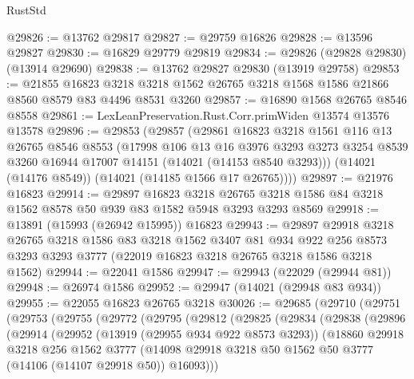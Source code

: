 \begin{lexlean}{RustStd}
\begin{coremodule}
@29826 := @13762 @29817
@29827 := @29759 @16826
@29828 := @13596 @29827
@29830 := @16829 @29779 @29819
@29834 := @29826 (@29828 @29830) (@13914 @29690)
@29838 := @13762 @29827 @29830 (@13919 @29758)
@29853 := @21855
    @16823
    @3218
    @3218
    @1562
    @26765
    @3218
    @1568
    @1586
    @21866
    @8560
    @8579
    @83
    @4496
    @8531
    @3260
@29857 := @16890 @1568 @26765 @8546 @8558
@29861 := LexLeanPreservation.Rust.Corr.primWiden @13574 @13576 @13578
@29896 := @29853
    (@29857
      (@29861
        @16823
        @3218
        @1561
        @116
        @13
        @26765
        @8546
        @8553
        (@17998
          @106
          @13
          @16
          @3976
          @3293
          @3273
          @3254
          @8539
          @3260
          @16944
          @17007
          @14151
          (@14021 (@14153 @8540 @3293)))
        (@14021 (@14176 @8549))
        (@14021 (@14185 @1566 @17 @26765))))
@29897 := @21976 @16823
@29914 := @29897
    @16823
    @3218
    @26765
    @3218
    @1586
    @84
    @3218
    @1562
    @8578
    @50
    @939
    @83
    @1582
    @5948
    @3293
    @3293
    @8569
@29918 := @13891 (@15993 (@26942 @15995)) @16823
@29943 := @29897
    @29918
    @3218
    @26765
    @3218
    @1586
    @83
    @3218
    @1562
    @3407
    @81
    @934
    @922
    @256
    @8573
    @3293
    @3293
    @3777
    (@22019 @16823 @3218 @26765 @3218 @1586 @3218 @1562)
@29944 := @22041 @1586
@29947 := @29943 (@22029 (@29944 @81))
@29948 := @26974 @1586
@29952 := @29947 (@14021 (@29948 @83 @934))
@29955 := @22055 @16823 @26765 @3218
@30026 := @29685
    (@29710
      (@29751
        (@29753
          (@29755
            (@29772
              (@29795
                (@29812
                  (@29825
                    (@29834
                      (@29838
                        (@29896
                          (@29914
                            (@29952
                              (@13919 (@29955 @934 @922 @8573 @3293))
                              (@18860
                                @29918
                                @3218
                                @256
                                @1562
                                @3777
                                (@14098
                                  @29918
                                  @3218
                                  @50
                                  @1562
                                  @50
                                  @3777
                                  (@14106 (@14107 @29918 @50))
                                  @16093)))

\end{coremodule}
\end{lexlean}
